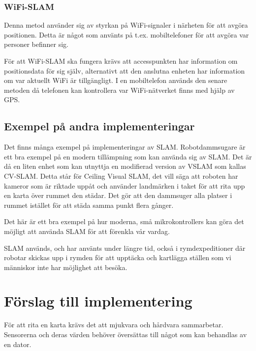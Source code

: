 \documentclass[a4paper,12pt,fleqn]{article}
\begin{document}
\subsubsection{WiFi-SLAM}
Denna metod använder sig av styrkan på WiFi-signaler i närheten för att avgöra positionen. Detta är något som använts på t.ex. mobiltelefoner för att avgöra var personer befinner sig. 

För att WiFi-SLAM ska fungera krävs att accesspunkten har information om positionsdata för sig själv, alternativt att den anslutna enheten har information om var aktuellt WiFi är tillgängligt. I en mobiltelefon används den senare metoden då telefonen kan kontrollera var WiFi-nätverket finns med hjälp av GPS. 

\subsection{Exempel på andra implementeringar}

Det finns många exempel på implementeringar av SLAM. Robotdammsugare är ett bra exempel på en modern tillämpning som kan använda sig av SLAM. Det är då en liten enhet som kan utnyttja en modifierad version av VSLAM som kallas CV-SLAM. Detta står för Ceiling Visual SLAM, det vill säga att roboten har kameror som är riktade uppåt och använder landmärken i taket för att rita upp en karta över rummet den städar. Det gör att den dammsuger alla platser i rummet istället för att städa samma punkt flera gånger. 

Det här är ett bra exempel på hur moderna, små mikrokontrollers kan göra det möjligt att använda SLAM för att förenkla vår vardag.

SLAM används, och har använts under längre tid, också i rymdexpeditioner där robotar skickas upp i rymden för att upptäcka och kartlägga ställen som vi människor inte har möjlighet att besöka. 

\newpage
\section{Förslag till implementering}

För att rita en karta krävs det att mjukvara och hårdvara sammarbetar. Sensorerna och deras värden behöver översättas till något som kan behandlas av en dator. 

\end{document}
